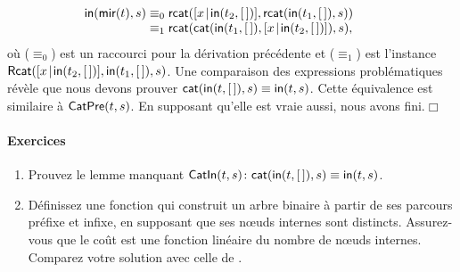 \begin{equation*}
\begin{array}{@{}r@{\;}c@{\;}l@{\qquad}r@{}}
\fun{in}(\fun{mir}(t),s)
& \equiv_0
& \fun{rcat}(\cons{x}{\fun{in}(t_2,\el)},
  \fun{rcat}(\fun{in}(t_1,\el),s))\\
& \equiv_1
& \fun{rcat}(\fun{cat}(\fun{in}(t_1,\el),
  \cons{x}{\fun{in}(t_2,\el)}), s),\index{rcat@\fun{rcat/2}|)}
\end{array}
\end{equation*}
où (\(\equiv_0\)) est un raccourci pour la dérivation précédente et
(\(\equiv_1\)) est l'instance
\(\textsf{Rcat}({[{x}\!\mid\!{\textsf{in}(t_2,[\,])}], \textsf{in}(t_1,[\,]),
  s})\). Une comparaison des expressions problématiques révèle que nous
devons prouver \(\textsf{cat}(\textsf{in}(t,[\,]),s) \equiv
\textsf{in}(t,s)\). Cette équivalence est similaire à
\(\textsf{CatPre}({t,s})\). En supposant
qu'elle est vraie aussi, nous avons fini.\hfill\(\Box\)

\paragraph{Exercices}
\begin{enumerate}

  \item Prouvez le lemme manquant \(\textsf{CatIn}({t,s}) \colon
  \textsf{cat}(\textsf{in}(t,[\,]),s) \equiv
  \textsf{in}(t,s)\).

 \item Définissez une fonction qui construit un arbre binaire à partir
  de ses parcours préfixe et infixe, en supposant que ses n{\oe}uds
  internes sont distincts. Assurez-vous que le coût est une fonction
  linéaire du nombre de n{\oe}uds internes. Comparez votre solution
  avec celle de \cite{MuBird_2003}.

\end{enumerate}


